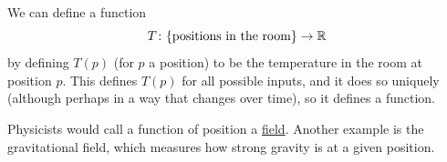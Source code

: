 \documentclass[fleqn]{LectureClass/LectureClass}
\begin{document}
    \begin{exm}{}{}
        We can define a function
        \begin{equation}
            T \colon \{\text{positions in the room}\} \to \mathbb{R}
        \end{equation}
        by defining \(T(p)\) (for \(p\) a position) to be the temperature in the room at position \(p\).
        This defines \(T(p)\) for all possible inputs, and it does so uniquely (although perhaps in a way that changes over time), so it defines a function.
        
        Physicists would call a function of position a \href{https://en.wikipedia.org/wiki/Field_(physics)}{field}.
        Another example is the gravitational field, which measures how strong gravity is at a given position.
    \end{exm}
    
\end{document}
